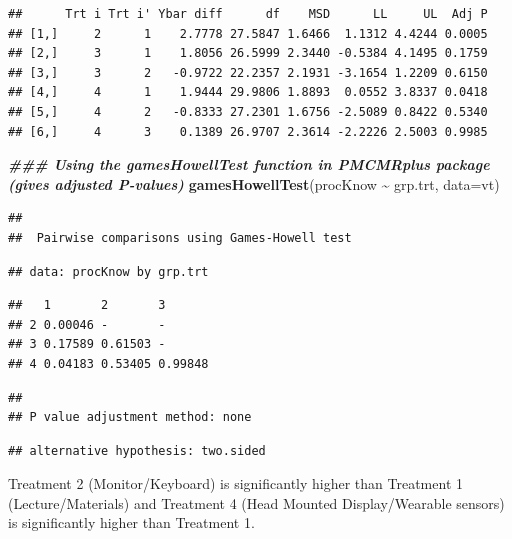 \documentclass[
]{book}
\newenvironment{Shaded}{\begin{snugshade}}{\end{snugshade}}
\newcommand{\AttributeTok}[1]{\textcolor[rgb]{0.13,0.29,0.53}{#1}}
\newcommand{\DecValTok}[1]{\textcolor[rgb]{0.00,0.00,0.81}{#1}}
\newcommand{\DocumentationTok}[1]{\textcolor[rgb]{0.56,0.35,0.01}{\textbf{\textit{#1}}}}
\newcommand{\FunctionTok}[1]{\textcolor[rgb]{0.13,0.29,0.53}{\textbf{#1}}}
\newcommand{\NormalTok}[1]{#1}
\newcommand{\SpecialCharTok}[1]{\textcolor[rgb]{0.81,0.36,0.00}{\textbf{#1}}}
\begin{document}
\begin{Shaded}
\end{Shaded}

\begin{verbatim}
##      Trt i Trt i' Ybar diff      df    MSD      LL     UL  Adj P
## [1,]     2      1    2.7778 27.5847 1.6466  1.1312 4.4244 0.0005
## [2,]     3      1    1.8056 26.5999 2.3440 -0.5384 4.1495 0.1759
## [3,]     3      2   -0.9722 22.2357 2.1931 -3.1654 1.2209 0.6150
## [4,]     4      1    1.9444 29.9806 1.8893  0.0552 3.8337 0.0418
## [5,]     4      2   -0.8333 27.2301 1.6756 -2.5089 0.8422 0.5340
## [6,]     4      3    0.1389 26.9707 2.3614 -2.2226 2.5003 0.9985
\end{verbatim}

\begin{Shaded}
\begin{Highlighting}[]
\DocumentationTok{\#\#\# Using the gamesHowellTest function in PMCMRplus package (gives adjusted P{-}values)}
\FunctionTok{gamesHowellTest}\NormalTok{(procKnow }\SpecialCharTok{\textasciitilde{}}\NormalTok{ grp.trt, }\AttributeTok{data=}\NormalTok{vt)}
\end{Highlighting}
\end{Shaded}

\begin{verbatim}
## 
##  Pairwise comparisons using Games-Howell test
\end{verbatim}

\begin{verbatim}
## data: procKnow by grp.trt
\end{verbatim}

\begin{verbatim}
##   1       2       3      
## 2 0.00046 -       -      
## 3 0.17589 0.61503 -      
## 4 0.04183 0.53405 0.99848
\end{verbatim}

\begin{verbatim}
## 
## P value adjustment method: none
\end{verbatim}

\begin{verbatim}
## alternative hypothesis: two.sided
\end{verbatim}

Treatment 2 (Monitor/Keyboard) is significantly higher than Treatment 1
(Lecture/Materials) and Treatment 4 (Head Mounted Display/Wearable
sensors) is significantly higher than Treatment 1.
\end{document}
